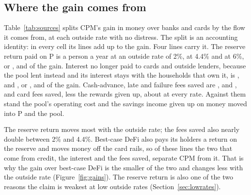 \begin{table}[htbp]\centering\small
\resizebox{\linewidth}{!}{}
\caption{CPM against banks and cards and against best-case DeFi over the \CellsNoDistress{} cells with no distress,
in dollars a person a year: median and range over cells. The lower block counts the cells where each clause of
the registered claim passes on the \NumSeeds{} confirmation seeds.}
\label{tab:gains}
\end{table}

\subsection{Where the gain comes from}

Table~\ref{tab:sources} splits CPM's gain in money over banks and cards by the flow it comes from, at each outside
rate with no distress. The split is an accounting identity: in every cell its lines add up to the gain. Four lines
carry it. The reserve return paid on P is \SourceYieldTwo{} a person a year at an outside rate of 2\%,
\SourceYieldFourFour{} at 4.4\% and \SourceYieldSix{} at 6\%, or \SourceYieldShareTwo{},
\SourceYieldShareFourFour{} and \SourceYieldShareSix{} of the gain. Interest no longer paid to cards and outside
lenders, because the pool lent instead and its interest stays with the households that own it, is
\SourceInterestTwo{}, \SourceInterestFourFour{} and \SourceInterestSix{}, or \SourceInterestShareTwo{},
\SourceInterestShareFourFour{} and \SourceInterestShareSix{} of the gain. Cash-advance, late and failure fees saved are \SourceFeesTwo{},
\SourceFeesFourFour{} and \SourceFeesSix{}, and card fees saved, less the rewards given up, about
\SourceCardFourFour{} at every rate. Against them stand the pool's operating cost and the savings income given up
on money moved into P and the pool.

The reserve return moves most with the outside rate; the fees saved also nearly double between 2\% and 4.4\%. Best-case DeFi also pays its holders a return on the
reserve and moves money off the card rails, so of these lines the two that come from credit, the interest and the
fees saved, separate CPM from it. That is why the gain over best-case DeFi is the smaller of the two and
changes less with the outside rate (Figure~\ref{fig:gains}). The reserve return is also one of the two reasons the
claim is weakest at low outside rates (Section~\ref{sec:lowrates}).

\begin{table}[htbp]\centering\small

\caption{CPM's gain in money over banks and cards by the flow it comes from, in dollars a person a year: the median
over the seven launch levels at each outside rate, with no distress. The lines add up to the gain in each cell;
medians over cells need not add up exactly.}
\label{tab:sources}
\end{table}

